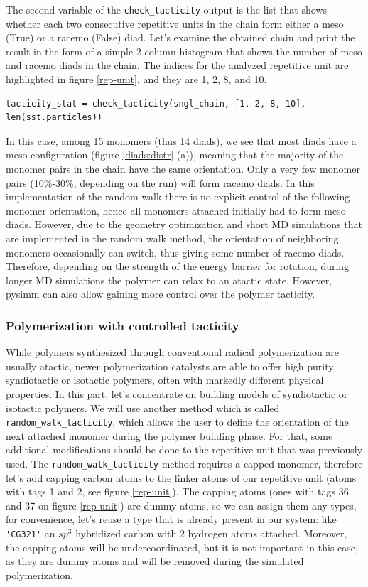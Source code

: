 \documentclass[9pt,tutorial]{livecoms}
\begin{document}
The second variable of the \lstinline$check_tacticity$ output is the list that shows whether each two consecutive repetitive units in the chain form either a meso (True) or a racemo (False) diad. Let's examine the obtained chain and print the result in the form of a simple 2-column histogram that shows the number of meso and racemo diads in the chain. The indices for the analyzed repetitive unit are highlighted in figure \ref{rep-unit}, and they are 1, 2, 8, and 10.

\begin{lstlisting}
tacticity_stat = check_tacticity(sngl_chain, [1, 2, 8, 10], len(sst.particles))
\end{lstlisting}

In this case, among 15 monomers (thus 14 diads), we see that most diads have a meso configuration (figure \ref{diads:distr}-(a)), meaning that the majority of the monomer pairs in the chain have the same orientation. Only a very few monomer pairs (10\%-30\%, depending on the run) will form racemo diads. In this implementation of the random walk there is no explicit control of the following monomer orientation, hence all monomers attached initially had to form meso diads. However, due to the geometry optimization and short MD simulations that are implemented in the random walk method, the orientation of neighboring monomers occasionally can switch, thus giving some number of racemo diads. Therefore, depending on the strength of the energy barrier for rotation, during longer MD simulations the polymer can relax to an atactic state. However, pysimm can also allow gaining more control over the polymer tacticity.


\subsubsection{Polymerization with controlled tacticity}
While polymers synthesized through conventional radical polymerization are usually atactic, newer polymerization catalysts are able to offer high purity syndiotactic or isotactic polymers, often with markedly different physical properties. In this part, let's concentrate on building models of syndiotactic or isotactic polymers. We will use another method which is called \lstinline$random_walk_tacticity$, which allows the user to define the orientation of the next attached monomer during the polymer building phase. For that, some additional modifications should be done to the repetitive unit that was previously used. The \lstinline$random_walk_tacticity$ method requires a capped monomer, therefore let's add capping carbon atoms to the linker atoms of our repetitive unit (atoms with tags 1 and 2, see figure \ref{rep-unit}). The capping atoms (ones with tags 36 and 37 on figure \ref{rep-unit}) are dummy atoms, so we can assign them any types, for convenience, let's reuse a type that is already present in our system: like \lstinline$'CG321'$ an $sp^3$ hybridized carbon with 2 hydrogen atoms attached. Moreover, the capping atoms will be undercoordinated, but it is not important in this case, as they are dummy atoms and will be removed during the simulated polymerization.
\end{document}
